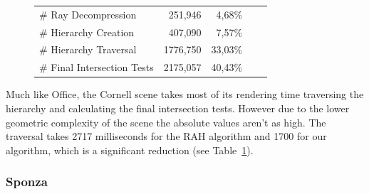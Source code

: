 \begin{figure}[!htb]
\begin{minipage}{0.725\linewidth}
\begin{tabular}[h]{l|rrrr}
            \quad \# Ray Decompression          & 251,946   & 4,68\%    \\
            \quad \# Hierarchy Creation         & 407,090   & 7,57\%    \\
            \quad \# Hierarchy Traversal        & 1776,750  & 33,03\%   \\
            \quad \# Final Intersection Tests   & 2175,057  & 40,43\%	\\
        \end{tabular}
        \label{table:cornell-time-results}
    \end{minipage}
\end{figure}

Much like Office, the Cornell scene takes most of its rendering time traversing the hierarchy and calculating the final intersection tests. However due to the lower geometric complexity of the scene the absolute values aren't as high. The traversal takes 2717 milliseconds for the RAH algorithm and 1700 for our algorithm, which is a significant reduction (see Table~\ref{table:cornell-time-results}).

\vfill

\pagebreak

\subsubsection{Sponza}

